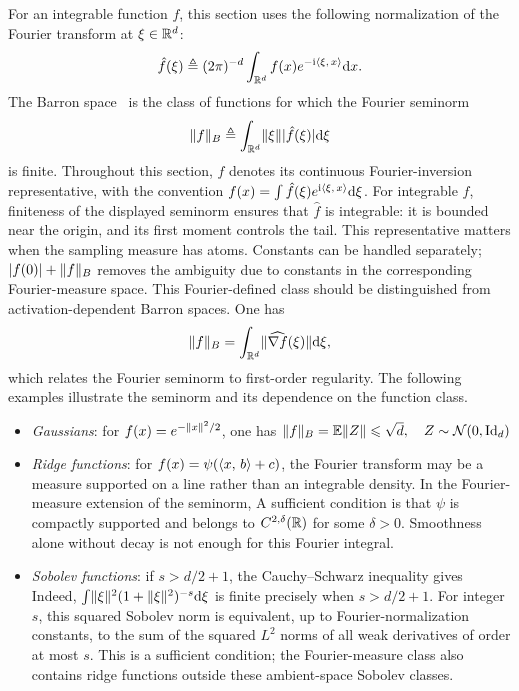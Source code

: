 For an integrable function $f$, this section uses the following normalization of the Fourier transform at $\xi \in \mathbb{R}^d$:
$$
    \hat f(\xi)\triangleq(2\pi)^{-d}\int_{\mathbb{R}^d}f(x)e^{-\mathrm{i}\langle \xi,\,x\rangle}\mathrm{d} x.
$$
The Barron space~\cite{barron1993universal} is the class of functions for which the Fourier seminorm
$$
	\lVert f\rVert_B \triangleq  \int_{\mathbb{R}^d}\lVert\xi\rVert | \hat{f}(\xi) | \mathrm{d}\xi 
$$ 
is finite. Throughout this section, $f$ denotes its continuous Fourier-inversion representative, with the convention $f(x)=\int\hat f(\xi)e^{\mathrm{i}\langle \xi,\,x\rangle}\mathrm{d}\xi$. For integrable $f$, finiteness of the displayed seminorm ensures that $\hat f$ is integrable: it is bounded near the origin, and its first moment controls the tail. This representative matters when the sampling measure has atoms. Constants can be handled separately; $|f(0)|+\lVert f\rVert_B$ removes the ambiguity due to constants in the corresponding Fourier-measure space. This Fourier-defined class should be distinguished from activation-dependent Barron spaces.
One has
$$
	\lVert f\rVert_B = \int_{\mathbb{R}^d} \lVert\widehat{\nabla f}(\xi)\rVert \mathrm{d}\xi, 
$$ 
which relates the Fourier seminorm to first-order regularity.
%
The following examples illustrate the seminorm and its dependence on the function class.
\begin{itemize}
    \item \emph{Gaussians}: for $f(x) = e^{- \lVert x\rVert^2/2}$, one has $\lVert f\rVert_B=\mathbb{E}\lVert Z\rVert\leqslant\sqrt d,\quad Z\sim\mathcal N(0,\mathrm{Id}_d)$
    \item \emph{Ridge functions}: for $f(x)=\psi(\langle x,\,b\rangle+c)$, the Fourier transform may be a measure supported on a line rather than an integrable density. In the Fourier-measure extension of the seminorm,
A sufficient condition is that $\psi$ is compactly supported and belongs to $C^{2,\delta}(\mathbb{R})$ for some $\delta>0$. Smoothness alone without decay is not enough for this Fourier integral.
    \item \emph{Sobolev functions}: if $s>d/2+1$, the Cauchy--Schwarz inequality gives
Indeed, $\int\lVert\xi\rVert^2(1+\lVert\xi\rVert^2)^{-s}\mathrm{d}\xi$ is finite precisely when $s>d/2+1$. For integer $s$, this squared Sobolev norm is equivalent, up to Fourier-normalization constants, to the sum of the squared $L^2$ norms of all weak derivatives of order at most $s$. This is a sufficient condition; the Fourier-measure class also contains ridge functions outside these ambient-space Sobolev classes.
\end{itemize}


